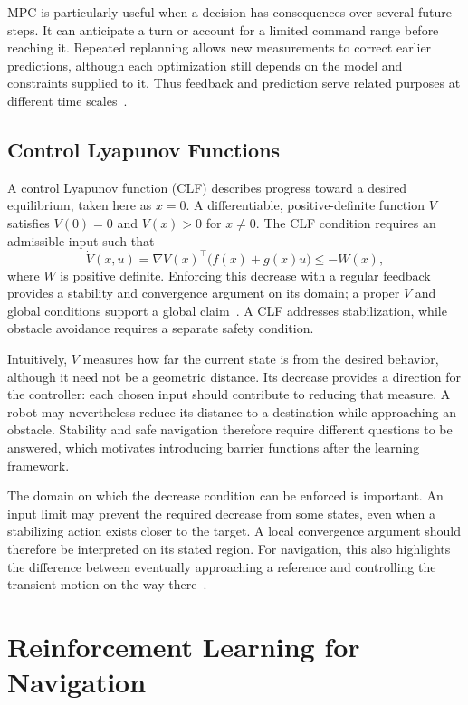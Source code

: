 MPC is particularly useful when a decision has consequences over several future steps. It can anticipate a turn or account for a limited command range before reaching it. Repeated replanning allows new measurements to correct earlier predictions, although each optimization still depends on the model and constraints supplied to it. Thus feedback and prediction serve related purposes at different time scales~\cite{rootFeedback,rootMurray}.

\clearpage
\subsection{Control Lyapunov Functions}
A control Lyapunov function (CLF) describes progress toward a desired equilibrium, taken here as $x=0$. A differentiable, positive-definite function $V$ satisfies $V(0)=0$ and $V(x)>0$ for $x\neq0$. The CLF condition requires an admissible input such that
\begin{equation}
\dot V(x,u)=\nabla V(x)^\top\bigl(f(x)+g(x)u\bigr)\leq-W(x),
\label{eq:clfcondition}
\end{equation}
where $W$ is positive definite. Enforcing this decrease with a regular feedback provides a stability and convergence argument on its domain; a proper $V$ and global conditions support a global claim~\cite{rootFeedback}. A CLF addresses stabilization, while obstacle avoidance requires a separate safety condition.

Intuitively, $V$ measures how far the current state is from the desired behavior, although it need not be a geometric distance. Its decrease provides a direction for the controller: each chosen input should contribute to reducing that measure. A robot may nevertheless reduce its distance to a destination while approaching an obstacle. Stability and safe navigation therefore require different questions to be answered, which motivates introducing barrier functions after the learning framework.

The domain on which the decrease condition can be enforced is important. An input limit may prevent the required decrease from some states, even when a stabilizing action exists closer to the target. A local convergence argument should therefore be interpreted on its stated region. For navigation, this also highlights the difference between eventually approaching a reference and controlling the transient motion on the way there~\cite{rootFeedback}.

\FloatBarrier
\section{Reinforcement Learning for Navigation}
\label{lit:chapter}

